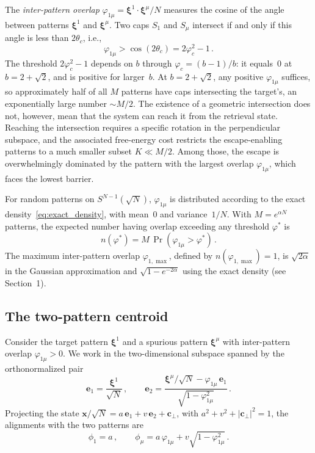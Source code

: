 \documentclass[11pt]{article}
\newcommand{\bxi}{\boldsymbol{\xi}}
\newcommand{\bx}{\mathbf{x}}
\begin{document}
The \emph{inter-pattern overlap} $\varphi_{1\mu} = \bxi^1\!\cdot\!\bxi^\mu/N$ measures the cosine of the angle between patterns $\bxi^1$ and $\bxi^\mu$.  Two caps $S_1$ and $S_\mu$ intersect if and only if this angle is less than $2\theta_c$, i.e.,
\begin{equation}
\varphi_{1\mu} > \cos(2\theta_c) = 2\varphi_c^2 - 1\,.
\label{eq:cap_intersection}
\end{equation}
The threshold $2\varphi_c^2 - 1$ depends on $b$ through $\varphi_c = (b-1)/b$: it equals~$0$ at $b = 2+\sqrt{2}$, and is positive for larger~$b$.  At $b = 2+\sqrt{2}$, any positive $\varphi_{1\mu}$ suffices, so approximately half of all $M$ patterns have caps intersecting the target's, an exponentially large number $\sim M/2$.  The existence of a geometric intersection does not, however, mean that the system can reach it from the retrieval state.  Reaching the intersection requires a specific rotation in the perpendicular subspace, and the associated free-energy cost restricts the escape-enabling patterns to a much smaller subset $K \ll M/2$.  Among those, the escape is overwhelmingly dominated by the pattern with the largest overlap $\varphi_{1\mu}$, which faces the lowest barrier.

For random patterns on $S^{N-1}(\!\sqrt{N})$, $\varphi_{1\mu}$ is distributed according to the exact density~\eqref{eq:exact_density}, with mean~$0$ and variance~$1/N$.  With $M = e^{\alpha N}$ patterns, the expected number having overlap exceeding any threshold $\varphi^*$ is
\begin{equation}
n(\varphi^*) = M\,\Pr(\varphi_{1\mu} > \varphi^*)\,.
\label{eq:n_count}
\end{equation}
The maximum inter-pattern overlap $\varphi_{1,\max}$, defined by $n(\varphi_{1,\max}) = 1$, is $\sqrt{2\alpha}$ in the Gaussian approximation and $\sqrt{1-e^{-2\alpha}}$ using the exact density (see Section~1).

\subsection{The two-pattern centroid}
\label{ssec:centroid}

Consider the target pattern $\bxi^1$ and a spurious pattern $\bxi^\mu$ with inter-pattern overlap $\varphi_{1\mu} > 0$.  We work in the two-dimensional subspace spanned by the orthonormalized pair
\begin{equation}
\mathbf{e}_1 = \frac{\bxi^1}{\sqrt{N}}\,, \qquad
\mathbf{e}_2 = \frac{\bxi^\mu/\sqrt{N} - \varphi_{1\mu}\,\mathbf{e}_1}{\sqrt{1-\varphi_{1\mu}^2}}\,.
\label{eq:basis}
\end{equation}
Projecting the state $\bx/\sqrt{N} = a\,\mathbf{e}_1 + v\,\mathbf{e}_2 + \mathbf{c}_\perp$, with $a^2 + v^2 + |\mathbf{c}_\perp|^2 = 1$, the alignments with the two patterns are
\begin{equation}
\phi_1 = a\,, \qquad \phi_\mu = a\,\varphi_{1\mu} + v\sqrt{1-\varphi_{1\mu}^2}\,.
\label{eq:overlaps}
\end{equation}
\end{document}
